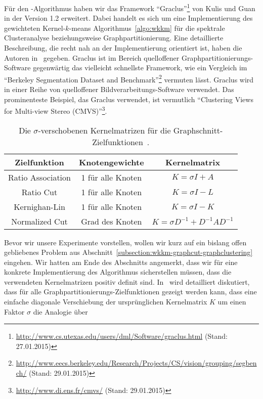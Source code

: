 Für den \kkmpp-Algorithmus haben wir das Framework
"`Graclus"'\footnote{\url{http://www.cs.utexas.edu/users/dml/Software/graclus.html} (Stand: 27.01.2015)} von Kulis und Guan
in der Version 1.2 erweitert. Dabei handelt es sich um eine Implementierung des gewichteten Kernel-$k$-means Algorithmus~\ref{algo:wkkm} für
die spektrale Clusteranalyse beziehungsweise Graphpartitionierung. Eine detaillierte Beschreibung, die recht nah an
der Implementierung orientiert ist, haben die Autoren in~\cite{DhillonGK07} gegeben. Graclus ist im Bereich quelloffener
Graphpartitionierungs-Software gegenwärtig das vielleicht schnellste Framework, wie ein Vergleich im
"`Berkeley Segmentation Dataset and
Benchmark"'\footnote{\url{http://www.eecs.berkeley.edu/Research/Projects/CS/vision/grouping/segbench/} (Stand: 29.01.2015)}
vermuten lässt. Graclus wird in einer Reihe von quelloffener Bildverarbeitungs-Software verwendet. Das prominenteste Beispiel,
das Graclus verwendet, ist vermutlich "`Clustering Views for Multi-view
Stereo (CMVS)"'\footnote{\url{http://www.di.ens.fr/cmvs/} (Stand: 29.01.2015)}.
\absatz
\begin{table}[t]
\centering
\begin{tabular}{@{}ccc@{}} \toprule
	\textbf{Zielfunktion} & \textbf{Knotengewichte} & \textbf{Kernelmatrix} \\ \midrule
	Ratio Association & 1 für alle Knoten & $K = \sigma I + A$ \\
	Ratio Cut & 1 für alle Knoten & $K = \sigma I - L$ \\
	Kernighan-Lin & 1 für alle Knoten & $K = \sigma I - K$ \\
	Normalized Cut & Grad des Knoten & $K = \sigma D^{-1} + D^{-1} A D^{-1}$ \\ \bottomrule
\end{tabular}
\caption{Die $\sigma$-verschobenen Kernelmatrizen für die Graphschnitt-Zielfunktionen~\cite{DhillonGK04}.}
\label{tbl:experiment-kernel-matrices}
\end{table}
Bevor wir unsere Experimente vorstellen, wollen wir kurz auf ein bislang offen gebliebenes Problem aus
Abschnitt~\ref{subsection:wkkm-graphcut-graphclustering} eingehen. Wir hatten am Ende des Abschnitts angemerkt, dass
wir für eine konkrete Implementierung des Algorithmus sicherstellen müssen, dass die verwendeten Kernelmatrizen positiv definit
sind. In~\cite{DhillonGK07} wird detailliert diskutiert, dass für alle Graphpartitionierungs-Zielfunktionen gezeigt werden kann,
dass eine einfache diagonale Verschiebung der ursprünglichen Kernelmatrix $K$ um einen Faktor $\sigma$ die Analogie über
